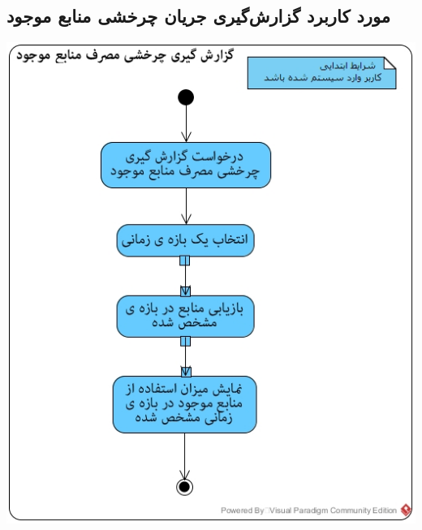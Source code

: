 \subsection*{مورد کاربرد گزارش‌گیری جریان چرخشی منابع موجود}
\vspace{2cm}
\begin{center}
\includegraphics[width=\textwidth]{ActivityDiagrams/41.jpg}
\end{center}

\newpage
\vspace{2cm}

